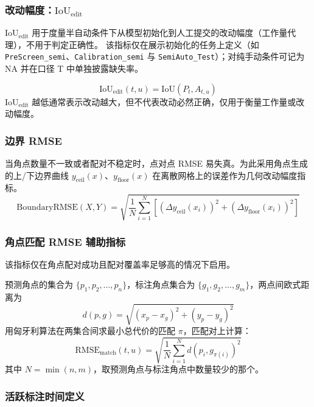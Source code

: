 \subsubsection{改动幅度：$\mathrm{IoU}_{\mathrm{edit}}$}\label{sec:method-iou-edit}
$\mathrm{IoU}_{\mathrm{edit}}$ 用于度量半自动条件下从模型初始化到人工提交的改动幅度（工作量代理），不用于判定正确性。
该指标仅在展示初始化的任务上定义（如 \texttt{PreScreen\_semi}、\texttt{Calibration\_semi} 与 \texttt{SemiAuto\_Test}）；对纯手动条件可记为 NA 并在口径 T 中单独披露缺失率。

\[\mathrm{IoU}_{\mathrm{edit}}\left(t,u\right)=\mathrm{IoU}\left(P_t,A_{t,u}\right)\]
$\mathrm{IoU}_{\mathrm{edit}}$ 越低通常表示改动越大，但不代表改动必然正确，仅用于衡量工作量或改动幅度。
\subsubsection{边界 RMSE}
当角点数量不一致或者配对不稳定时，点对点 RMSE 易失真。为此采用角点生成的上/下边界曲线 $y_{\mathrm{ceil}}\left(x\right)$、$y_{\mathrm{floor}}\left(x\right)$ 在离散网格上的误差作为几何改动幅度指标。
\[\mathrm{BoundaryRMSE}\left(X,Y\right)=\sqrt{\frac{1}{N}\sum_{i=1}^{N}\left[\left(\Delta y_{\mathrm{ceil}}\left(x_i\right)\right)^2+\left(\Delta y_{\mathrm{floor}}\left(x_i\right)\right)^2\right]}\]

\subsubsection{角点匹配 RMSE 辅助指标}
该指标仅在角点配对成功且配对覆盖率足够高的情况下启用。

预测角点的集合为 $\{p_1,p_2,\ldots,p_n\}$，标注角点集合为 $\{g_1,g_2,\ldots,g_m\}$，两点间欧式距离为
\[d\left(p,g\right)=\sqrt{\left(x_p-x_g\right)^2+\left(y_p-y_g\right)^2}\]
用匈牙利算法在两集合间求最小总代价的匹配 $\pi$，匹配对上计算：
\[\mathrm{RMSE}_{\mathrm{match}}\left(t,u\right)=\sqrt{\frac{1}{N}\sum_{i=1}^{N}{d\left(p_i,g_{\pi\left(i\right)}\right)^2}}\]
其中 $N=\min\left(n,m\right)$，取预测角点与标注角点中数量较少的那个。
\subsubsection{活跃标注时间定义}\label{sec:method-active-time}

